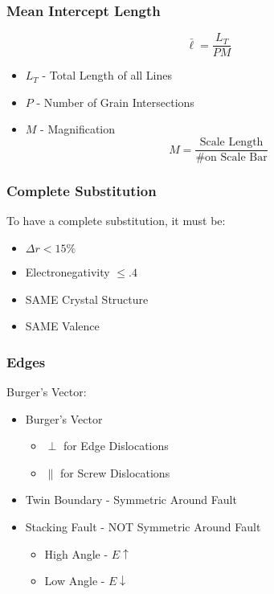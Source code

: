 		\subsubsection{Mean Intercept Length}
			\begin{equation}
				\bar{\ell} = \frac{L_{T}}{P M}
			\end{equation}
			\begin{itemize}[noitemsep]
				\item $L_{T}$ - Total Length of all Lines
				\item $P$ - Number of Grain Intersections
				\item $M$ - Magnification
					\begin{equation}
						M = \frac{\text{Scale Length}}{\text{\# on Scale Bar}}
					\end{equation}
			\end{itemize}
		
		\subsubsection{Complete Substitution}
		To have a complete substitution, it must be:
			\begin{itemize}[noitemsep]
				\item $\Delta r < 15\%$
				\item Electronegativity $\leq .4$
				\item SAME Crystal Structure
				\item SAME Valence
			\end{itemize}
		
		\subsubsection{Edges}
		Burger's Vector:
			\begin{itemize}[noitemsep]
				\item Burger's Vector
				\begin{itemize}[noitemsep]
					\item $\perp$ for Edge Dislocations
					\item $\parallel$ for Screw Dislocations
				\end{itemize}
				\item Twin Boundary - Symmetric Around Fault
				\item Stacking Fault - NOT Symmetric Around Fault
				\begin{itemize}[noitemsep]
					\item High Angle - $E \uparrow$
					\item Low Angle - $E \downarrow$
				\end{itemize}
			\end{itemize}
		
